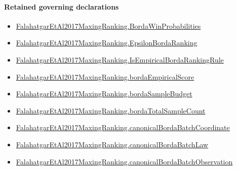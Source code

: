 \documentclass[10pt]{article}
\begin{document}
\paragraph{Retained governing declarations}
\begin{itemize}\raggedright
\item \hyperlink{paper-prerequisite-5ac1483a89567450}{Falahatgar\allowbreak{}Et\allowbreak{}Al2017\allowbreak{}Maxing\allowbreak{}Ranking.\allowbreak{}Borda\allowbreak{}Win\allowbreak{}Probabilities}
\item \hyperlink{paper-prerequisite-7a741c130d5e42b2}{Falahatgar\allowbreak{}Et\allowbreak{}Al2017\allowbreak{}Maxing\allowbreak{}Ranking.\allowbreak{}Epsilon\allowbreak{}Borda\allowbreak{}Ranking}
\item \hyperlink{paper-prerequisite-28cb5f649d63c5cb}{Falahatgar\allowbreak{}Et\allowbreak{}Al2017\allowbreak{}Maxing\allowbreak{}Ranking.\allowbreak{}Is\allowbreak{}Empirical\allowbreak{}Borda\allowbreak{}Ranking\allowbreak{}Rule}
\item \hyperlink{paper-prerequisite-2a72291ebc16ccb3}{Falahatgar\allowbreak{}Et\allowbreak{}Al2017\allowbreak{}Maxing\allowbreak{}Ranking.\allowbreak{}borda\allowbreak{}Empirical\allowbreak{}Score}
\item \hyperlink{governing-declaration-c579bc9140b69fad}{Falahatgar\allowbreak{}Et\allowbreak{}Al2017\allowbreak{}Maxing\allowbreak{}Ranking.\allowbreak{}borda\allowbreak{}Sample\allowbreak{}Budget}
\item \hyperlink{governing-declaration-98a37b9422f680ad}{Falahatgar\allowbreak{}Et\allowbreak{}Al2017\allowbreak{}Maxing\allowbreak{}Ranking.\allowbreak{}borda\allowbreak{}Total\allowbreak{}Sample\allowbreak{}Count}
\item \hyperlink{governing-declaration-8edb67932b6e00e4}{Falahatgar\allowbreak{}Et\allowbreak{}Al2017\allowbreak{}Maxing\allowbreak{}Ranking.\allowbreak{}canonical\allowbreak{}Borda\allowbreak{}Batch\allowbreak{}Coordinate}
\item \hyperlink{governing-declaration-bc3edfccbf4be274}{Falahatgar\allowbreak{}Et\allowbreak{}Al2017\allowbreak{}Maxing\allowbreak{}Ranking.\allowbreak{}canonical\allowbreak{}Borda\allowbreak{}Batch\allowbreak{}Law}
\item \hyperlink{governing-declaration-68260ae3aff5e5e0}{Falahatgar\allowbreak{}Et\allowbreak{}Al2017\allowbreak{}Maxing\allowbreak{}Ranking.\allowbreak{}canonical\allowbreak{}Borda\allowbreak{}Batch\allowbreak{}Observation}
\end{itemize}
\end{document}
